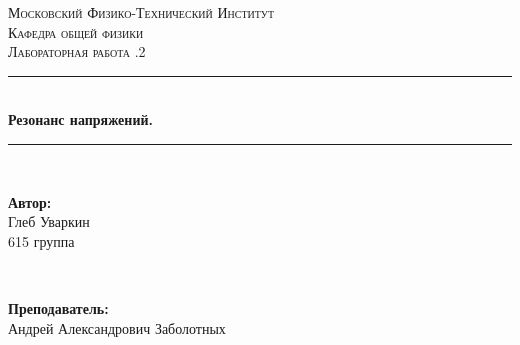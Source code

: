 \documentclass[a4paper, 12pt, twoside]{article}
\begin{document}
\begin{titlepage}

\newcommand{\HRule}{\rule{\linewidth}{0.7mm}} %

\center %
 

\textsc{\LARGE Московский Физико-Технический Институт}\\[1,5cm] %
\textsc{\Large Кафедра общей физики}\\[0.5cm] %
\textsc{\large Лабораторная работа .2}\\[0.5cm] %


\HRule
\\[0.4cm]
{ \huge \bfseries Резонанс напряжений.}
\\[0.2cm] %
\HRule
\\[1.5cm]


 

\begin{minipage}{0.4\textwidth}
	\begin{flushleft} \large
		\textbf{Автор:}\\
		Глеб Уваркин \\
		615 группа
	\end{flushleft}
\end{minipage}
~
\begin{minipage}{0.4\textwidth}
	\begin{flushright} \large
		\textbf {Преподаватель:} \\
		Андрей Александрович Заболотных %
	\end{flushright}
\end{minipage}


\end{titlepage}
\end{document}
